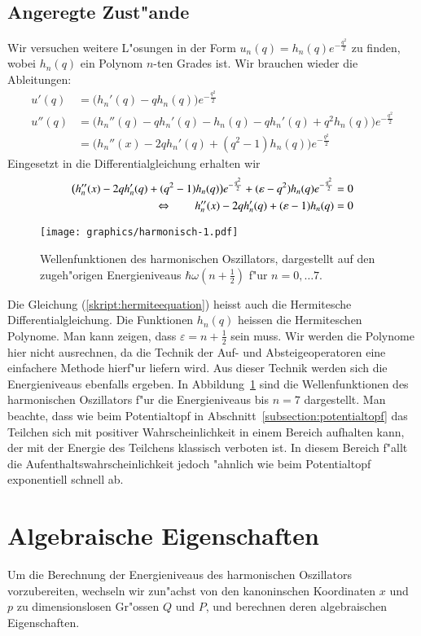 \subsection{Angeregte Zust"ande}
Wir versuchen weitere L"osungen in der Form $u_n(q)=h_n(q)e^{-\frac{q^2}2}$
zu finden, wobei $h_n(q)$ ein Polynom $n$-ten Grades ist.
Wir brauchen wieder die Ableitungen:
\begin{align*}
u'(q)
&=
\bigl(h_n'(q)- qh_n(q)\bigr)e^{-\frac{q^2}2}
\\
u''(q)
&=
\bigl(
h_n''(q)- qh_n'(q)
- h_n(q)
- q h_n'(q)
+q^2h_n(q)
\bigr)e^{-\frac{q^2}2}
\\
&=
\bigl(
h_n''(x)-2 qh_n'(q)
+(q^2-1)h_n(q)
\bigr)e^{-\frac{q^2}2}
\end{align*}
Eingesetzt in die Differentialgleichung erhalten wir
\begin{align}
\bigl(
h_n''(x)-2 qh_n'(q)
+(q^2-1)h_n(q)
\bigr)e^{-\frac{q^2}2}
+(\varepsilon-q^2)h_n(q)e^{-\frac{q^2}2}&=0
\notag
\\
\Leftrightarrow\qquad
h_n''(x)-2 qh_n'(q)
+(\varepsilon - 1)h_n(q)&=0
\label{skript:hermiteequation}
\end{align}
\begin{figure}
\centering
\texttt{[image: graphics/harmonisch-1.pdf]}
\caption{Wellenfunktionen des harmonischen Oszillators, dargestellt auf
den zugeh"origen Energieniveaus $\hbar \omega (n+\frac12)$ f"ur
$n=0,\dots 7$.
\label{skript:harmonisch-wellenfunktionen}}
\end{figure}%
Die Gleichung (\ref{skript:hermiteequation}) heisst auch die 
Hermitesche Differentialgleichung.
Die Funktionen $h_n(q)$ heissen die Hermiteschen Polynome.
Man kann zeigen, dass $\varepsilon=n+\frac12$ sein muss.
Wir werden die Polynome hier nicht ausrechnen, da die Technik der
Auf- und Absteigeoperatoren eine einfachere Methode hierf"ur liefern
wird.
Aus dieser Technik werden sich die Energieniveaus ebenfalls ergeben.
In Abbildung~\ref{skript:harmonisch-wellenfunktionen} sind die Wellenfunktionen
des harmonischen Oszillators f"ur die Energieniveaus bis $n=7$ dargestellt.
Man beachte, dass wie beim Potentialtopf in
Abschnitt~\ref{subsection:potentialtopf} das Teilchen sich mit positiver
Wahrscheinlichkeit in einem Bereich aufhalten kann, der mit der Energie
des Teilchens klassisch verboten ist.
In diesem Bereich f"allt die Aufenthaltswahrscheinlichkeit jedoch
"ahnlich wie beim Potentialtopf exponentiell schnell ab.

\section{Algebraische Eigenschaften}
Um die Berechnung der Energieniveaus des harmonischen Oszillators
vorzubereiten, wechseln wir zun"achst von den kanoninschen Koordinaten
$x$ und $p$ zu dimensionslosen Gr"ossen $Q$ und $P$, und berechnen
deren algebraischen Eigenschaften.
